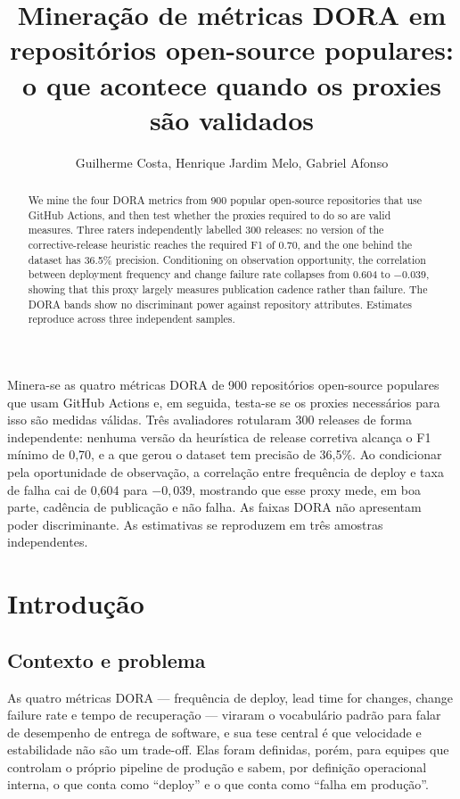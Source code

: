 \documentclass[12pt]{article}
\title{Mineração de métricas DORA em repositórios open-source populares:\\
o que acontece quando os proxies são validados}
\author{Guilherme Costa\inst{1}, Henrique Jardim Melo\inst{1}, Gabriel Afonso\inst{1}}
\begin{document}
\maketitle

\begin{abstract}
We mine the four DORA metrics from 900 popular open-source repositories that use
GitHub Actions, and then test whether the proxies required to do so are valid
measures. Three raters independently labelled 300 releases: no version of the
corrective-release heuristic reaches the required F1 of 0.70, and the one behind
the dataset has 36.5\% precision. Conditioning on observation opportunity, the
correlation between deployment frequency and change failure rate collapses from
0.604 to $-0.039$, showing that this proxy largely measures publication cadence
rather than failure. The DORA bands show no discriminant power against repository
attributes. Estimates reproduce across three independent samples.
\end{abstract}

\begin{resumo}
Minera-se as quatro métricas DORA de 900 repositórios open-source populares que
usam GitHub Actions e, em seguida, testa-se se os proxies necessários para isso
são medidas válidas. Três avaliadores rotularam 300 releases de forma
independente: nenhuma versão da heurística de release corretiva alcança o F1
mínimo de 0,70, e a que gerou o dataset tem precisão de 36,5\%. Ao condicionar
pela oportunidade de observação, a correlação entre frequência de deploy e taxa
de falha cai de 0,604 para $-0,039$, mostrando que esse proxy mede, em boa parte,
cadência de publicação e não falha. As faixas DORA não apresentam poder
discriminante. As estimativas se reproduzem em três amostras independentes.
\end{resumo}

\section{Introdução}

\subsection{Contexto e problema}

As quatro métricas DORA — frequência de deploy, lead time for changes, change failure rate e tempo de recuperação — viraram o vocabulário padrão para falar de desempenho de entrega de software, e sua tese central é que velocidade e estabilidade não são um trade-off. Elas foram definidas, porém, para equipes que controlam o próprio pipeline de produção e sabem, por definição operacional interna, o que conta como ``deploy'' e o que conta como ``falha em produção''.
\end{document}
